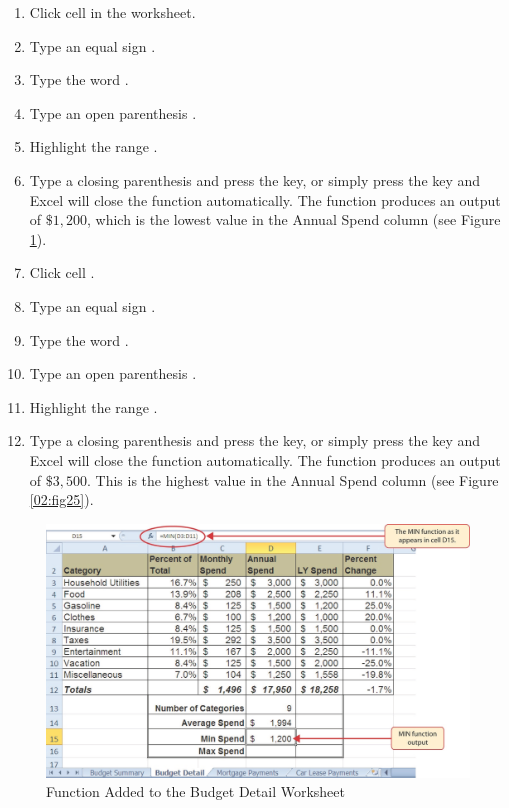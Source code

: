 \begin{enumerate}
	\item Click cell  in the  worksheet.
	\item Type an equal sign \fmtTyping{=}.
	\item Type the word .
	\item Type an open parenthesis \fmtTyping{(}.
	\item Highlight the range .
	\item Type a closing parenthesis \fmtTyping{)} and press the  key, or simply press the  key and Excel will close the function automatically. The  function produces an output of $ \$1,200 $, which is the lowest value in the Annual Spend column (see Figure \ref{02:fig24}).
	\item Click cell .
	\item Type an equal sign \fmtTyping{=}.
	\item Type the word .
	\item Type an open parenthesis \fmtTyping{(}.
	\item Highlight the range .
	\item Type a closing parenthesis \fmtTyping{)} and press the  key, or simply press the  key and Excel will close the function automatically. The  function produces an output of $ \$3,500 $. This is the highest value in the Annual Spend column (see Figure \ref{02:fig25}).
\end{enumerate}

\begin{figure}[H]
	\centering
	\includegraphics[width=\maxwidth{.95\linewidth}]{gfx/ch02_fig24}
	\caption{ Function Added to the Budget Detail Worksheet}
	\label{02:fig24}
\end{figure}

